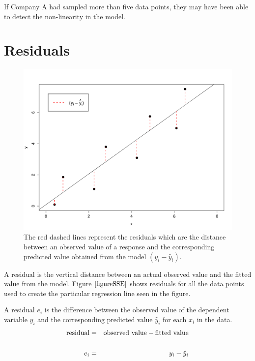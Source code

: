 \begin{example}
\begin{benumerate}
If Company A had sampled more than five data points, they may have been able to detect the non-linearity in the model.
\end{benumerate}
\end{example}






\section{Residuals}
\label{sectionResiduals}

\vspace{-0.65cm}
\begin{figure}[H]
	\begin{center}
	\includegraphics[width=12cm]{Section8/plotSSE.pdf}
	\end{center}
	\vspace{-0.750cm}
	\label{figureSSE}
	\caption{The red dashed lines represent the
	 	residuals which are the
		distance between an observed value of a response and the 
		corresponding predicted value obtained from the model $(y_{i} - \hat{y}_{i})$. }
\end{figure}

A residual is the vertical distance between an actual observed value
and the fitted value from the model.
Figure $\ref{figureSSE}$ shows residuals for all the data points used to
create the particular regression line seen in the figure.

\begin{definition}[Residual]
\label{defResidual}
A residual $e_{i}$ is the difference between the observed value of the dependent variable $y_{i}$ 
and the corresponding predicted value $\hat{y}_{i}$ for each $x_{i}$ in the data.
	\begin{eqnarray}
	\text{residual} & = & \text{observed value} - \text{fitted value}\\
	\hfill \nonumber\\
	e_{i} & = & y_{i} - \hat{y}_{i}
	\end{eqnarray}
\end{definition}
\hfill

